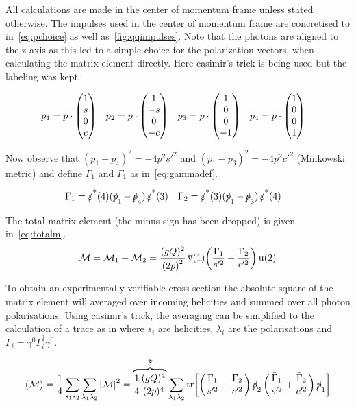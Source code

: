 All calculations are made in the center of momentum frame unless
stated otherwise.  The impulses used in the center of momentum frame
are concretised to in~\eqref{eq:pchoice} as well
as~\ref{fig:qqimpulses}.  Note that the photons are aligned to the
z-axis as this led to a simple choice for the polarization vectors,
when calculating the matrix element directly. Here casimir's trick is
being used but the labeling was kept.


\begin{align}
  \label{eq:pchoice}
  p_1&=p\cdot\mqty(1 \\ s \\ 0 \\ c)
     & p_2&=p\cdot\mqty(1 \\ -s \\ 0 \\ -c)
     & p_3&=p\cdot\mqty(1 \\ 0 \\ 0 \\ -1)
     & p_4&=p\cdot\mqty(1 \\ 0 \\ 0 \\ 1)
\end{align}

Now observe that \((p_1-p_4)^2=-4p^2s'^2\) and
\((p_1-p_3)^2=-4p^2c'^2\) (Minkowski metric) and define \(\Gamma_1\)
and \(\Gamma_1\) as in~\eqref{eq:gammadef}.

\begin{align}
  \label{eq:gammadef}
  \Gamma_1 &= \pses(4)(\ps_1 - \ps_4)\pses(3) &
  \Gamma_2 &= \pses(3)(\ps_1 - \ps_3)\pses(4)
\end{align}

The total matrix element (the minus sign has been dropped) is given in~\eqref{eq:totalm}.
\begin{equation}
  \label{eq:totalm}
  \mathcal{M} = \mathcal{M}_1 + \mathcal{M}_2 = \frac{(gQ)^2}{\qty(2p)^2}\operatorname*{\overline{v}}(1)\qty(\frac{\Gamma_1}{s'^2}+\frac{\Gamma_2}{c'^2})\operatorname{u}(2)
\end{equation}

To obtain an experimentally verifiable cross section the absolute square of the
matrix element will averaged over incoming helicities and summed over
all photon polarisations.  Using casimir's trick, the averaging can be
simplified to the calculation of a trace as in where \(s_i\) are
helicities, \(\lambda_i\) are the polarisations and \(\bar{\Gamma}_i=\gamma^0\Gamma^\dagger_i\gamma^0\).

\begin{equation}
  \label{eq:averagedm}
  \langle\mathcal{M}\rangle = \frac{1}{4}\sum_{s_1 s_2}\sum_{\lambda_1
    \lambda_2} \abs{\mathcal{M}}^2=\overbrace{\frac{1}{4}\frac{(gQ)^4}{(2p)^4}}^\mathfrak{F}\sum_{\lambda_1
    \lambda_2}\tr[\qty(\frac{\Gamma_1}{s'^2}+\frac{\Gamma_2}{c'^2})
  \operatorname{\slashed{p}}_2\qty(\frac{\bar{\Gamma}_1}{s'^2}+\frac{\bar{\Gamma}_2}{c'^2})\operatorname{\slashed{p}}_1]
\end{equation}

